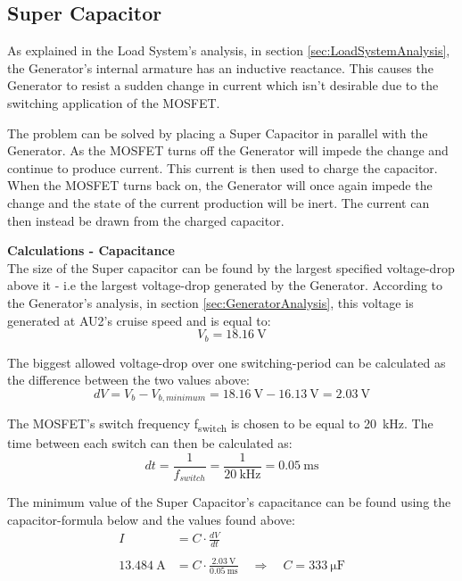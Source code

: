 \subsection{Super Capacitor}
As explained in the Load System's analysis, in section \vref{sec:LoadSystemAnalysis}, the Generator's internal armature has an inductive reactance. This causes the Generator to resist a sudden change in current which isn't desirable due to the switching application of the MOSFET.

The problem can be solved by placing a Super Capacitor in parallel with the Generator. As the MOSFET turns off the Generator will impede the change and continue to produce current. This current is then used to charge the capacitor. When the MOSFET turns back on, the Generator will once again impede the change and the state of the current production will be inert. The current can then instead be drawn from the charged capacitor.


\textbf{Calculations - Capacitance}\\
The size of the Super capacitor can be found by the largest specified voltage-drop above it - i.e the largest voltage-drop generated by the Generator. According to the Generator's analysis, in section \vref{sec:GeneratorAnalysis}, this voltage is generated at AU2's cruise speed and is equal to:
\begin{equation}
	V_b = \SI{18.16}{\volt}
\end{equation}
 
The biggest allowed voltage-drop over one switching-period can be calculated as the difference between the two values above:
\begin{equation}
	dV = V_b - V_{b,minimum} = \SI{18.16}{\volt} - \SI{16.13}{\volt} = \SI{2.03}{\volt}
\end{equation}
 
The MOSFET's switch frequency f\textsubscript{switch} is chosen to be equal to \SI{20}{\kilo \hertz}. The time between each switch can then be calculated as:
\begin{equation}
	dt = \frac{1}{f_{switch}} = \frac{1}{\SI{20}{\kilo \hertz}} = \SI{0.05}{\milli \second}
\end{equation}

The minimum value of the Super Capacitor's capacitance can be found using the capacitor-formula below and the values found above:
\begin{equation}
	\begin{split}
		I &= C \cdot \frac{dV}{dt}\\
		\\
		\SI{13.484}{\ampere} &= C \cdot \frac{\SI{2.03}{\volt}}{\SI{0.05}{\milli \second}} \quad \Rightarrow \quad C = \SI{333}{\micro \farad}
	\end{split}
\end{equation}

